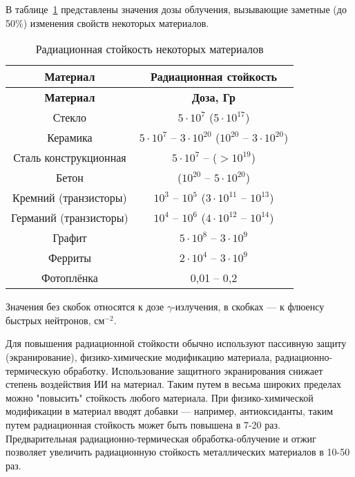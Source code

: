 В таблице~\ref{tab:ecology} представлены значения дозы облучения, вызывающие заметные (до 50\%) изменения свойств некоторых материалов.

\begin{longtable}[c]{|c|c|}
    \caption{Радиационная стойкость некоторых материалов}
    \label{tab:ecology}\\
    \hline
    \textbf{Материал} & \textbf{Радиационная стойкость}\\
    \hline
    \endfirsthead
    \hline
    \textbf{Материал} & \textbf{Доза, Гр}\\
    \hline
    \endhead
        Стекло & $5 \cdot 10^7$ ($5 \cdot 10^{17}$)\\
        \hline
        Керамика & $5 \cdot 10^7$ -- $3 \cdot 10^{20}$ ($10^{20}$ -- $3 \cdot 10^{20}$)\\
        \hline
        Сталь конструкционная & $5 \cdot 10^7$ -- ($> 10^{19}$)\\
        \hline
        Бетон & ($10^{20}$ -- $5 \cdot 10^{20}$)\\
        \hline
        Кремний (транзисторы) & $10^3$ -- $10^5$ ($3 \cdot 10^{11}$ -- $10^{13}$)\\
        \hline
        Германий (транзисторы) & $10^4$ -- $10^6$ ($4 \cdot 10^{12}$ -- $10^{14}$)\\
        \hline
        Графит & $5 \cdot 10^8$ -- $3 \cdot 10^9$\\
        \hline
        Ферриты & $2 \cdot 10^4$ -- $3 \cdot 10^9$\\
        \hline
        Фотоплёнка & 0,01 -- 0,2\\
        \hline
\end{longtable}

Значения без скобок относятся к дозе $\gamma$-излучения, в скобках --- к флюенсу быстрых нейтронов, $\textrm{см}^{-2}$.

Для повышения радиационной стойкости обычно используют пассивную защиту (экранирование), физико-химические модификацию материала, радиационно-термическую обработку. Использование защитного экранирования снижает степень воздействия ИИ на материал. Таким путем в весьма широких пределах можно "повысить" стойкость любого материала. При физико-химической модификации в материал вводят добавки --- например, антиоксиданты, таким путем радиационная стойкость может быть повышена в 7-20 раз. Предварительная радиационно-термическая обработка-облучение и отжиг позволяет увеличить радиационную стойкость металлических материалов в 10-50 раз.
